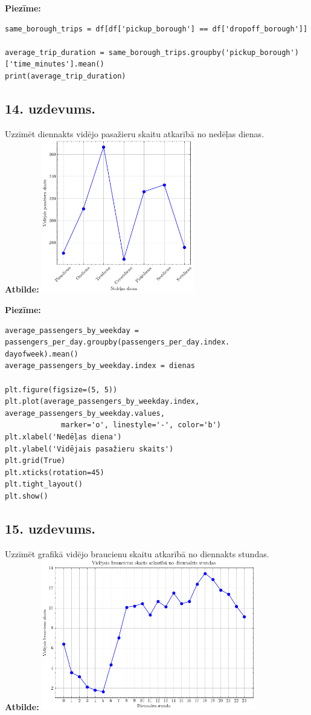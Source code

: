 \documentclass[12pt]{article}
\begin{document}
\noindent \textbf{Piezīme:}
\begin{verbatim}
same_borough_trips = df[df['pickup_borough'] == df['dropoff_borough']]

average_trip_duration = same_borough_trips.groupby('pickup_borough')['time_minutes'].mean()
print(average_trip_duration)
\end{verbatim}
\subsection*{14. uzdevums.} Uzzīmēt diennakts vidējo pasažieru skaitu atkarībā no nedēļas dienas.\\
\textbf{Atbilde:} \includegraphics[width=0.5\textwidth]{14.uzd.png}

\noindent \textbf{Piezīme:}
\begin{verbatim}
average_passengers_by_weekday = passengers_per_day.groupby(passengers_per_day.index.
dayofweek).mean()
average_passengers_by_weekday.index = dienas

plt.figure(figsize=(5, 5))
plt.plot(average_passengers_by_weekday.index, average_passengers_by_weekday.values,
             marker='o', linestyle='-', color='b')
plt.xlabel('Nedēļas diena')
plt.ylabel('Vidējais pasažieru skaits')
plt.grid(True)
plt.xticks(rotation=45)
plt.tight_layout()
plt.show()
\end{verbatim}
\subsection*{15. uzdevums.} Uzzīmēt grafikā vidējo braucienu skaitu atkarībā no diennakts stundas.\\
\textbf{Atbilde:} \includegraphics[width=0.7\textwidth]{15.uzd.png}
\end{document}
